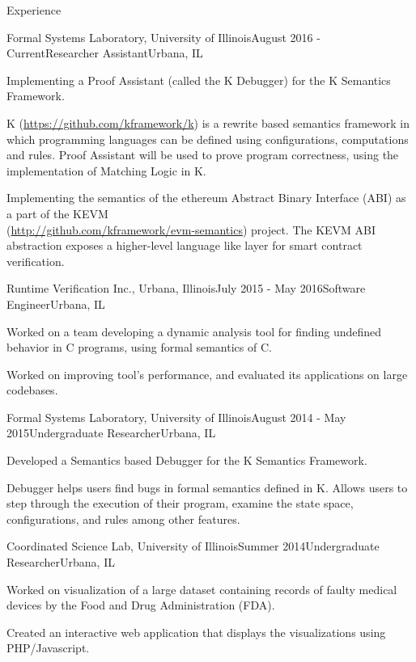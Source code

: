 \documentclass{resume} %
\begin{document}
\begin{rSection}{Experience}

\begin{rSubsection}{Formal Systems Laboratory, University of Illinois}{August 2016 - Current}{Researcher Assistant}{Urbana, IL}
\item Implementing a Proof Assistant (called the K Debugger) for the K Semantics Framework.
\item K (\url{https://github.com/kframework/k}) is a rewrite based semantics framework in which programming
languages can be defined using configurations, computations and rules. Proof Assistant will be used to prove program correctness, using the implementation of Matching Logic in K.
\item Implementing the semantics of the ethereum Abstract Binary Interface (ABI) as a part of the KEVM \\
  (\url{http://github.com/kframework/evm-semantics}) project. The KEVM ABI abstraction
  exposes a higher-level language like layer for smart contract verification.
\end{rSubsection}

\begin{rSubsection}{Runtime Verification Inc., Urbana, Illinois}{July 2015 - May 2016}{Software Engineer}{Urbana, IL}
\item Worked on a team developing a dynamic analysis tool for finding undefined behavior in C programs, using formal semantics of C.
\item Worked on improving tool's performance, and evaluated its applications on large codebases.
\end{rSubsection}

\begin{rSubsection}{Formal Systems Laboratory, University of Illinois}{August 2014 - May 2015}{Undergraduate Researcher}{Urbana, IL}
\item Developed a Semantics based Debugger for the K Semantics Framework.
\item Debugger helps users find bugs in formal semantics defined in K. Allows users to step
through the execution of their program, examine the state space, configurations, and rules
among other features.
\end{rSubsection}

\begin{rSubsection}{Coordinated Science Lab, University of Illinois}{Summer 2014}{Undergraduate Researcher}{Urbana, IL}
\item Worked on visualization of a large dataset containing records of faulty medical devices by the Food and Drug Administration (FDA).
\item Created an interactive web application that displays the visualizations using PHP/Javascript.
\end{rSubsection}



\end{rSection}
\end{document}
